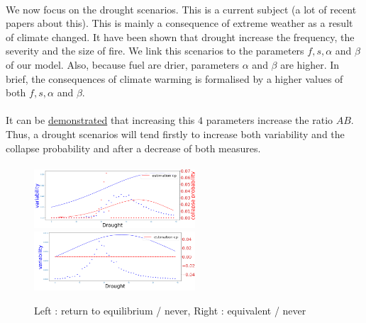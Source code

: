 \documentclass{article}
\begin{document}
\paragraph{}
We now focus on the drought scenarios. This is a current subject (a lot of recent papers about this). This is mainly a consequence of extreme weather as a result of climate changed. It have been shown that drought increase the frequency, the severity and the size of fire. We link this scenarios to the parameters $f, s, \alpha$ and $\beta$ of our model. Also, because fuel are drier, parameters $\alpha$ and $\beta$ are higher. In brief, the consequences of climate warming is formalised by a higher values of both $f, s, \alpha$ and $\beta$.



\paragraph{}
It can be \hyperref[drought_increase]{demonstrated} that increasing this $4$ parameters increase the ratio $AB$. Thus, a drought scenarios will tend firstly to increase both variability and the collapse probability and after a decrease of both measures.

\paragraph{}



\begin{figure}[h]
\begin{center}
\includegraphics[width=6cm]{results/drought/return_never.png}
\includegraphics[width=6cm]{results/drought/equivalent_never.png}
\end{center}
\caption{\label{fig:temp}Left : return to equilibrium / never, Right : equivalent / never}
\end{figure}
\end{document}
